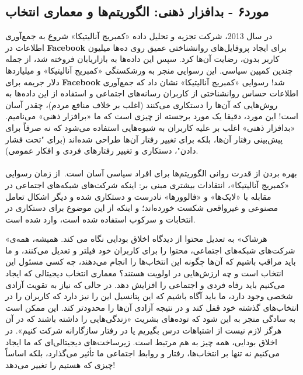 \subsection*{مورد۶ - بدافزار ذهنی: الگوریتم‌ها و معماری انتخاب}
در سال 2013، شرکت تجزیه و تحلیل داده «کمبریج آنالیتیکا» شروع به جمع‌آوری اطلاعات در \textenglish{\textbf{Facebook}} برای ایجاد پروفایل‌های روانشناختی عمیق روی ده‌ها میلیون کاربر بدون، رضایت آن‌ها کرد.
سپس این داده‌ها به بازاریابان فروخته شد، از جمله چندین کمپین سیاسی.
این رسوایی منجر به ورشکستگی «کمبریج آنالیتیکا» و میلیاردها دلار جریمه برای \textenglish{\textbf{Facebook}} شد!
رسوایی «کمبریج آنالیتیکا» نشان داد که جمع‌آوری اطلاعات حساس روانشناختی از کاربران رسانه‌های اجتماعی و استفاده از این داده‌ها به روش‌هایی که آن‌ها را دستکاری می‌کنند (اغلب بر خلاف منافع مردم)، چقدر آسان است!
این مورد، دقیقا یک مورد برجسته از چیزی است که ما «برافزار ذهنی» می‌نامیم.
«بدافزار ذهنی» اغلب بر علیه کاربران به شیوه‌هایی استفاده می‌شود که نه صرفاً برای پیش‌بینی رفتار آن‌ها، بلکه برای تغییر رفتار آن‌ها طراحی شده‌اند (برای "تحت فشار دادن"، دستکاری و تغییر رفتارهای فردی و افکار عمومی).

\paragraph{}
بهره بردن از قدرت روانی الگوریتم‌ها برای افراد سیاسی آسان است.\     از زمان رسوایی «کمبریج آنالیتیکا»، انتقادات بیشتری مبنی بر: اینکه شرکت‌های شبکه‌های اجتماعی در مقابله با «لایک‌ها» و «فالوورها» نادرست و دستکاری شده و دیگر اشکال تعامل مصنوعی و غیرواقعی شکست خورده‌اند؛ و اینکه از این موضوع برای دستکاری در انتخابات و سرکوب استفاده شده است، وارد شده است.

«هرشاک» به تعدیل محتوا از دیدگاه اخلاق بودایی نگاه می کند.
همیشه، همه‌ی شرکت‌های شبکه‌های اجتماعی، محتوا را برای کاربران خود فیلتر و تعدیل می‌کنند، و ما باید مراقب باشیم که آن‌ها چگونه این انتخاب‌ها را انجام می‌دهند، چه کسی مسئول این انتخاب است و چه ارزش‌هایی در اولویت هستند؟ معماری انتخاب دیجیتالی که ایجاد می‌کنیم باید رفاه فردی و اجتماعی را افزایش دهد.
در حالی که نیاز به تقویت آزادی شخصی وجود دارد، ما باید آگاه باشیم که این پتانسیل این را نیز دارد که کاربران را در انتخاب‌های گذشته خود قفل کند و در نتیجه آزادی آن‌ها را محدودتر کند.
این ممکن است به سادگی منجر به این شود که توده‌های بشریت «زندگی‌هایی را داشته باشند که در آن هرگز لازم نیست از اشتباهات درس بگیریم یا در رفتار سازگارانه شرکت کنیم».
در اخلاق بودایی، همه چیز به هم مرتبط است.
زیرساخت‌های دیجیتالی‌ای که ما ایجاد می‌کنیم نه تنها بر انتخاب‌ها، رفتار و روابط اجتماعی ما تأثیر می‌گذارد، بلکه اساساً چیزی که هستیم را تغییر می‌دهد!

